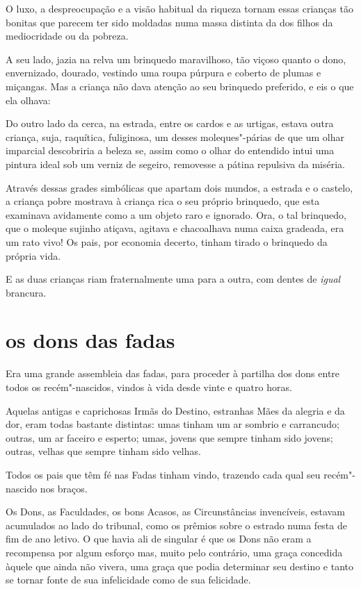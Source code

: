 O luxo, a despreocupação e a visão habitual da riqueza tornam essas
crianças tão bonitas que parecem ter sido moldadas numa massa distinta da
dos filhos da mediocridade ou da pobreza.

A seu lado, jazia na relva um brinquedo maravilhoso, tão viçoso
quanto o dono, envernizado, dourado, vestindo uma roupa púrpura
e coberto de plumas e miçangas. Mas a criança não dava atenção ao seu
brinquedo preferido, e eis o que ela olhava:

Do outro lado da cerca, na estrada, entre os cardos e as urtigas, estava
outra criança, suja, raquítica, fuliginosa, um desses moleques"-párias
de que um olhar imparcial descobriria a beleza se, assim como o olhar do
entendido intui uma pintura ideal sob um verniz de segeiro,
removesse a pátina repulsiva da miséria.

Através dessas grades simbólicas que apartam dois mundos, a estrada e o
castelo, a criança pobre mostrava à criança rica o seu próprio
brinquedo, que esta examinava avidamente como a um objeto raro e
ignorado. Ora, o tal brinquedo, que o moleque sujinho atiçava,
agitava e chacoalhava numa caixa gradeada, era um rato vivo! Os pais,
por economia decerto, tinham tirado o brinquedo da própria vida.

E as duas crianças riam fraternalmente uma para a outra, com dentes de
\textit{igual} brancura.

\quebra\section[Os dons das fadas]{os dons das fadas}

Era uma grande assembleia das fadas, para proceder à partilha dos dons
entre todos os recém"-nascidos, vindos à vida desde vinte e quatro horas.

Aquelas antigas e caprichosas Irmãs do Destino,
estranhas Mães da alegria e da dor, eram todas bastante distintas: umas
tinham um ar sombrio e carrancudo; outras, um ar faceiro e esperto;
umas, jovens que sempre tinham sido jovens; outras, velhas que sempre
tinham sido velhas.

Todos os pais que têm fé nas Fadas tinham vindo, trazendo cada qual seu
recém"-nascido nos braços.

Os Dons, as Faculdades, os bons Acasos, as Circunstâncias invencíveis,
estavam acumulados ao lado do tribunal, como os prêmios sobre o estrado
numa festa de fim de ano letivo. O que havia ali de singular é que os
Dons não eram a recompensa por algum esforço mas, muito pelo contrário,
uma graça concedida àquele que ainda não vivera, uma graça que podia
determinar seu destino e tanto se tornar fonte de sua infelicidade
como de sua felicidade.

